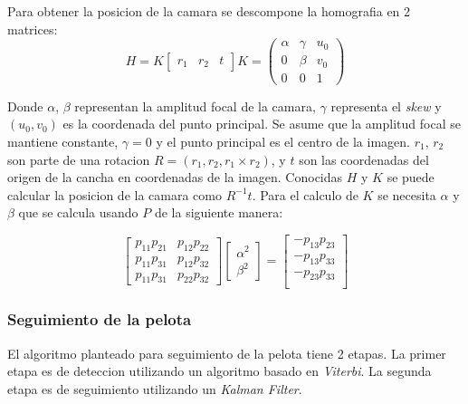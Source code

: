 \documentclass[a4paper,10pt]{article}
\begin{document}
Para obtener la posicion de la camara se descompone la homografia en 2 matrices:
\begin{equation}
H = K \begin{bmatrix} r_1 & r_2 & t \end{bmatrix}
K = \begin{pmatrix} 
    \alpha & \gamma & u_0 \\
    0 & \beta & v_0 \\
    0 & 0 & 1
    \end{pmatrix}
\end{equation}

Donde $\alpha$, $\beta$ representan la amplitud focal de la camara, $\gamma$ representa el \textit{skew} y $(u_0, v_0)$ es la coordenada del punto principal.
Se asume que la amplitud focal se mantiene constante, $\gamma = 0$ y el punto principal es el centro de la imagen.
$r_1$, $r_2$ son parte de una rotacion $R = (r_1, r_2, r_1 \times r_2)$, y $t$ son las coordenadas del origen de la cancha en coordenadas de la imagen.
Conocidas $H$ y $K$ se puede calcular la posicion de la camara como $R^{-1} t$.
Para el calculo de $K$ se necesita $\alpha$ y $\beta$ que se calcula usando $P$ de la siguiente manera:

\begin{equation}
\begin{bmatrix}
    p_{1 1} p_{2 1} & p_{1 2} p_{2 2} \\
    p_{1 1} p_{3 1} & p_{1 2} p_{3 2} \\
    p_{1 1} p_{3 1} & p_{2 2} p_{3 2} 
\end{bmatrix} 
\begin{bmatrix}
    \alpha^2 \\
    \beta^2
\end{bmatrix}
 =
\begin{bmatrix}
    - p_{1 3} p_{2 3} \\
    - p_{1 3} p_{3 3} \\
    - p_{2 3} p_{3 3} \\
\end{bmatrix}
\end{equation}

\subsubsection*{Seguimiento de la pelota}

El algoritmo planteado para seguimiento de la pelota tiene 2 etapas.
La primer etapa es de deteccion utilizando un algoritmo basado en \textit{Viterbi}.
La segunda etapa es de seguimiento utilizando un \textit{Kalman Filter}.
\end{document}
